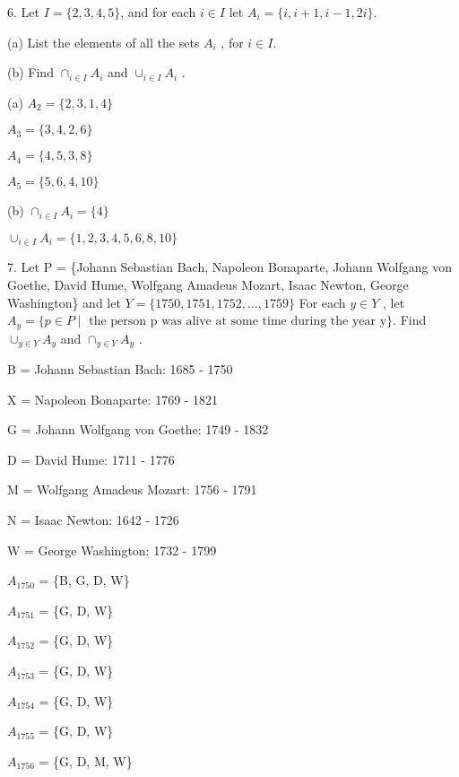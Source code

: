 \documentclass{article}
\begin{document}
\vspace{30pt}

6. Let $I = \{2, 3, 4, 5\}$, and for each $i \in I$ let $A_i = \{i,i + 1,i - 1, 2i\}$.

\hspace{12pt}(a) List the elements of all the sets $A_i$ , for $i \in I$.

\hspace{12pt}(b) Find $\cap_{i \in I} A_i$ and $\cup_{i \in I} A_i$ .
\vspace{30pt}

(a) $A_2 = \{2, 3, 1, 4\}$

$A_3 = \{3, 4, 2, 6\}$

$A_4 = \{4, 5, 3, 8\}$

$A_5 = \{5, 6, 4, 10\}$

\vspace{20pt}

(b) $\cap_{i \in I} A_i = \{4\}$

$\cup_{i \in I} A_i = \{1,2,3,4,5,6,8,10\} $

\vspace{30pt}

7. Let P = \{Johann Sebastian Bach, Napoleon Bonaparte, Johann
Wolfgang von Goethe, David Hume, Wolfgang Amadeus Mozart, Isaac
Newton, George Washington\} and let $Y = \{1750, 1751, 1752, \dots, 1759\}$
For each $y \in Y$ , let $A_y = \{p \in P \mid \text{ the person p was alive at some time during the year y}\}$.
Find $\cup_{y\in Y} A_y$ and $\cap_{y \in Y} A_y$ .
\vspace{30pt}

B = Johann Sebastian Bach: 1685 - 1750

X = Napoleon Bonaparte: 1769 - 1821

G = Johann Wolfgang von Goethe: 1749 - 1832

D = David Hume: 1711 - 1776

M = Wolfgang Amadeus Mozart: 1756 - 1791

N = Isaac Newton: 1642 - 1726

W = George Washington: 1732 - 1799

$A_{1750}$ = \{B, G, D, W\}

$A_{1751}$ = \{G, D, W\}

$A_{1752}$ = \{G, D, W\}

$A_{1753}$ = \{G, D, W\}

$A_{1754}$ = \{G, D, W\}

$A_{1755}$ = \{G, D, W\}

$A_{1756}$ = \{G, D, M, W\}
\end{document}
